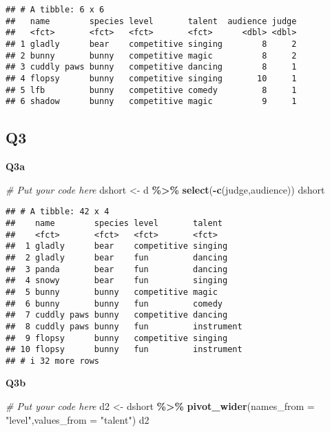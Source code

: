 \documentclass[
]{article}
\newenvironment{Shaded}{\begin{snugshade}}{\end{snugshade}}
\newcommand{\AttributeTok}[1]{\textcolor[rgb]{0.13,0.29,0.53}{#1}}
\newcommand{\CommentTok}[1]{\textcolor[rgb]{0.56,0.35,0.01}{\textit{#1}}}
\newcommand{\FunctionTok}[1]{\textcolor[rgb]{0.13,0.29,0.53}{\textbf{#1}}}
\newcommand{\NormalTok}[1]{#1}
\newcommand{\OtherTok}[1]{\textcolor[rgb]{0.56,0.35,0.01}{#1}}
\newcommand{\SpecialCharTok}[1]{\textcolor[rgb]{0.81,0.36,0.00}{\textbf{#1}}}
\newcommand{\StringTok}[1]{\textcolor[rgb]{0.31,0.60,0.02}{#1}}
\begin{document}
\begin{verbatim}
## # A tibble: 6 x 6
##   name        species level       talent  audience judge
##   <fct>       <fct>   <fct>       <fct>      <dbl> <dbl>
## 1 gladly      bear    competitive singing        8     2
## 2 bunny       bunny   competitive magic          8     2
## 3 cuddly paws bunny   competitive dancing        8     1
## 4 flopsy      bunny   competitive singing       10     1
## 5 lfb         bunny   competitive comedy         8     1
## 6 shadow      bunny   competitive magic          9     1
\end{verbatim}

\hypertarget{q3}{%
\subsection{Q3}\label{q3}}

\textbf{Q3a}

\begin{Shaded}
\begin{Highlighting}[]
\CommentTok{\# Put your code here}
\NormalTok{dshort }\OtherTok{\textless{}{-}}\NormalTok{ d }\SpecialCharTok{\%\textgreater{}\%}
  \FunctionTok{select}\NormalTok{(}\SpecialCharTok{{-}}\FunctionTok{c}\NormalTok{(judge,audience))}
\NormalTok{dshort}
\end{Highlighting}
\end{Shaded}

\begin{verbatim}
## # A tibble: 42 x 4
##    name        species level       talent    
##    <fct>       <fct>   <fct>       <fct>     
##  1 gladly      bear    competitive singing   
##  2 gladly      bear    fun         dancing   
##  3 panda       bear    fun         dancing   
##  4 snowy       bear    fun         singing   
##  5 bunny       bunny   competitive magic     
##  6 bunny       bunny   fun         comedy    
##  7 cuddly paws bunny   competitive dancing   
##  8 cuddly paws bunny   fun         instrument
##  9 flopsy      bunny   competitive singing   
## 10 flopsy      bunny   fun         instrument
## # i 32 more rows
\end{verbatim}

\textbf{Q3b}

\begin{Shaded}
\begin{Highlighting}[]
\CommentTok{\# Put your code here}
\NormalTok{d2 }\OtherTok{\textless{}{-}}\NormalTok{ dshort }\SpecialCharTok{\%\textgreater{}\%}
  \FunctionTok{pivot\_wider}\NormalTok{(}\AttributeTok{names\_from =} \StringTok{"level"}\NormalTok{,}\AttributeTok{values\_from =} \StringTok{"talent"}\NormalTok{)}
\NormalTok{d2}
\end{Highlighting}
\end{Shaded}
\end{document}
